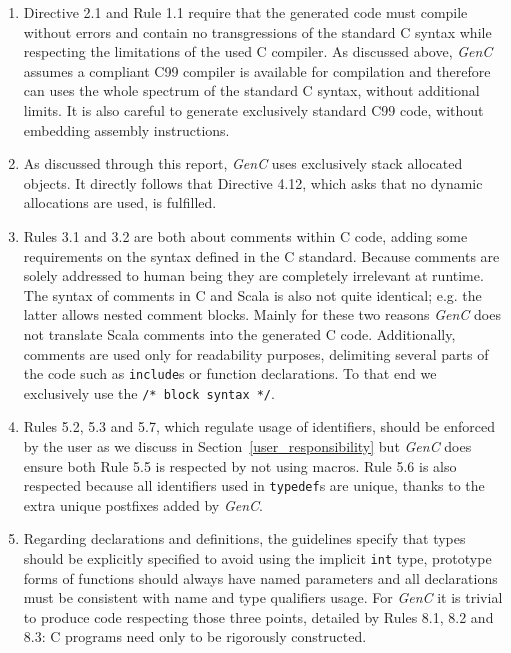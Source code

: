 \documentclass[a4paper,twoside]{article}
\newcommand{\InlineC}[1]{\lstinline[language=C99]|#1|}
\newcommand{\GenC}{\emph{GenC}\xspace}
\newcommand{\RefSec}[1]{Section~\ref{#1}}
\begin{document}
\begin{enumerate}

\item Directive 2.1 and Rule 1.1 require that the generated code must compile
without errors and contain no transgressions of the standard C syntax while
respecting the limitations of the used C compiler. As discussed above, \GenC
assumes a compliant C99 compiler is available for compilation and therefore can
uses the whole spectrum of the standard C syntax, without additional limits. It
is also careful to generate exclusively standard C99 code, without embedding
assembly instructions.

\item As discussed through this report, \GenC uses exclusively stack allocated
objects. It directly follows that Directive 4.12, which asks that no dynamic
allocations are used, is fulfilled.

\item Rules 3.1 and 3.2 are both about comments within C code, adding some
requirements on the syntax defined in the C standard. Because comments are
solely addressed to human being they are completely irrelevant at runtime. The
syntax of comments in C and Scala is also not quite identical; e.g. the latter
allows nested comment blocks. Mainly for these two reasons \GenC does not
translate Scala comments into the generated C code. Additionally, comments are
used only for readability purposes, delimiting several parts of the code such as
\InlineC{include}s or function declarations. To that end we exclusively use the
\InlineC{/* block syntax */}.

\item Rules 5.2, 5.3 and 5.7, which regulate usage of identifiers, should be
enforced by the user as we discuss in \RefSec{user_responsibility} but \GenC
does ensure both Rule 5.5 is respected by not using macros. Rule 5.6 is also
respected because all identifiers used in \InlineC{typedef}s are unique, thanks
to the extra unique postfixes added by \GenC.

\item Regarding declarations and definitions, the guidelines specify that types
should be explicitly specified to avoid using the implicit \InlineC{int} type,
prototype forms of functions should always have named parameters and all
declarations must be consistent with name and type qualifiers usage. For \GenC
it is trivial to produce code respecting those three points, detailed by Rules
8.1, 8.2 and 8.3: C programs need only to be rigorously constructed.


\end{enumerate}
\end{document}
